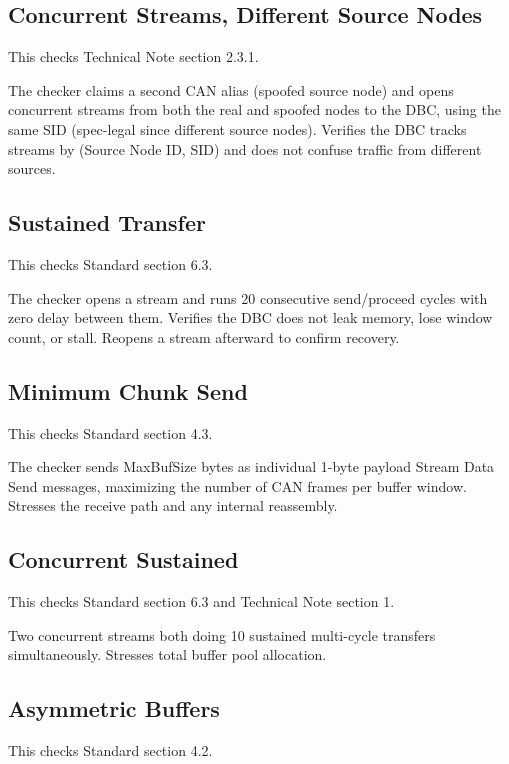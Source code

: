 \subsection{Concurrent Streams, Different Source Nodes}

This checks Technical Note section 2.3.1.

The checker claims a second CAN alias (spoofed source node) and opens
concurrent streams from both the real and spoofed nodes to the DBC, using the
same SID (spec-legal since different source nodes).  Verifies the DBC tracks
streams by (Source Node ID, SID) and does not confuse traffic from different
sources.

\subsection{Sustained Transfer}

This checks Standard section 6.3.

The checker opens a stream and runs 20 consecutive send/proceed cycles with
zero delay between them.  Verifies the DBC does not leak memory, lose window
count, or stall.  Reopens a stream afterward to confirm recovery.

\subsection{Minimum Chunk Send}

This checks Standard section 4.3.

The checker sends MaxBufSize bytes as individual 1-byte payload Stream Data
Send messages, maximizing the number of CAN frames per buffer window.
Stresses the receive path and any internal reassembly.

\subsection{Concurrent Sustained}

This checks Standard section 6.3 and Technical Note section 1.

Two concurrent streams both doing 10 sustained multi-cycle transfers
simultaneously.  Stresses total buffer pool allocation.

\subsection{Asymmetric Buffers}

This checks Standard section 4.2.

